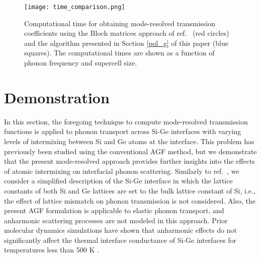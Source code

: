 \documentclass[11pt]{article}
\begin{document}
\begin{figure}
\begin{center}
\texttt{[image: time\_comparison.png]}
\caption{Computational time for obtaining mode-resolved transmission coefficients using the Bloch matrices approach of ref.~\cite{ong2015efficient} (red circles) and the algorithm presented in Section \ref{pol_g} of this paper (blue squares). The computational times are shown as a function of phonon frequency and supercell size.}
\label{comp_performance}
\end{center}
\end{figure}
\section{Demonstration}
In this section, the foregoing technique to compute mode-resolved transmission functions is applied to phonon transport across Si-Ge interfaces with varying levels of intermixing between Si and Ge atoms at the interface. This problem has previously been studied \cite{li2012effect,tian2012enhancing} using the conventional AGF method, but we demonstrate that the present mode-resolved approach provides further insights into the effects of atomic intermixing on interfacial phonon scattering. Similarly to ref.~\cite{tian2012enhancing}, we consider a simplified description of the Si-Ge interface in which the lattice constants of both Si and Ge lattices are set to the bulk lattice constant of Si, i.e., the effect of lattice mismatch on phonon transmission is not considered. Also, the present AGF formulation is applicable to elastic phonon transport, and anharmonic scattering processes are not modeled in this approach. Prior molecular dynamics simulations have shown that anharmonic effects do not significantly affect the thermal interface conductance of Si-Ge interfaces for temperatures less than 500 K \cite{landry2009thermal}. 
\end{document}
